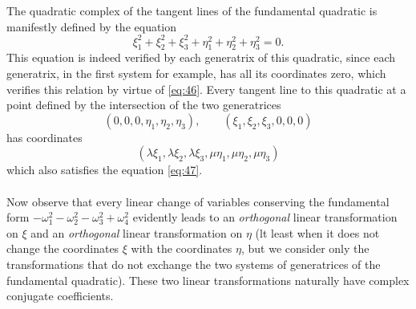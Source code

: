 \documentclass[leqno,12pt]{article}
\theoremstyle{shape1}
\theoremstyle{shape0}
\theoremstyle{shape2}
\theoremstyle{definition}
\begin{document}
The quadratic complex of the tangent lines of the fundamental quadratic is manifestly defined by the equation
\begin{equation}
  \label{eq:47}
  \xi_{1}^{2}+\xi_{2}^{2}+\xi_{3}^{2}+\eta_{1}^{2}+\eta_{2}^{2}+\eta_{3}^{2}=0.
\end{equation}
This equation is indeed verified by each generatrix of this quadratic, since each generatrix, in the first system for example, has all its coordinates zero, which verifies this relation by virtue of \eqref{eq:46}. Every tangent line to this quadratic at a point defined by the intersection of the two generatrices
\[
(0,0,0,\eta_{1},\eta_{2},\eta_{3}),\qquad(\xi_{1},\xi_{2},\xi_{3},0,0,0)
\]
has coordinates
\[
(\lambda\xi_{1},\lambda\xi_{2},\lambda\xi_{3},\mu\eta_{1},\mu\eta_{2},\mu\eta_{3})
\]
which also satisfies the equation \eqref{eq:47}.


\paragraph{}
\label{sec:28}
Now observe that every linear change of variables conserving the fundamental form $-\omega_{1}^{2}-\omega_{2}^{2}-\omega_{3}^{2}+\omega_{4}^{2}$ evidently leads to an \emph{orthogonal} linear transformation on $\xi$ and an \emph{orthogonal} linear transformation on $\eta$ (lt least when it does not change the coordinates $\xi$ with the coordinates $\eta$, but we consider only the transformations that do not exchange the two systems of generatrices of the fundamental quadratic). These two linear transformations naturally have complex conjugate coefficients.
\end{document}
